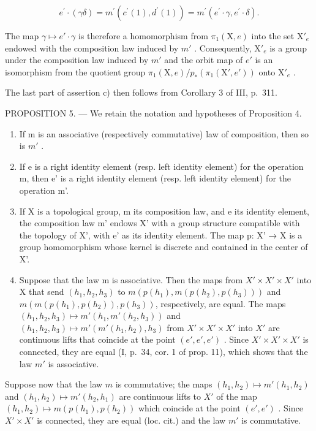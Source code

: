 \[
e ^ {\prime} \cdot (\gamma \delta) = m ^ {\prime} (c ^ {\prime} (1), d ^ {\prime} (1)) = m ^ {\prime} (e ^ {\prime} \cdot \gamma , e ^ {\prime} \cdot \delta).
\]

The map \(\gamma \mapsto e' \cdot \gamma\) is therefore a homomorphism from \(\pi_1(\mathrm{X}, e)\) into the set \(\mathrm{X}'_e\) endowed with the composition law induced by \(m'\) . Consequently, \(\mathrm{X}'_e\) is a group under the composition law induced by \(m'\) and the orbit map of \(e'\) is an isomorphism from the quotient group \(\pi_1(\mathrm{X}, e)/p_*(\pi_1(\mathrm{X}', e'))\) onto \(\mathrm{X}'_e\) .

The last part of assertion c) then follows from Corollary 3 of III, p.~311.

PROPOSITION 5. --- We retain the notation and hypotheses of Proposition 4.

\begin{enumerate}
\def\labelenumi{\alph{enumi})}
\item
  If m is an associative (respectively commutative) law of composition, then so is \(m'\) .
\item
  If e is a right identity element (resp. left identity element) for the operation m, then e' is a right identity element (resp. left identity element) for the operation m'.
\item
  If X is a topological group, m its composition law, and e its identity element, the composition law m' endows X' with a group structure compatible with the topology of X', with e' as its identity element. The map p: X' → X is a group homomorphism whose kernel is discrete and contained in the center of X'.
\item
  Suppose that the law m is associative. Then the maps from \(X' \times X' \times X'\) into X that send \((h_{1}, h_{2}, h_{3})\) to \(m(p(h_{1}),m(p(h_{2}),p(h_{3})))\) and \(m(m(p(h_{1}),p(h_{2})),p(h_{3}))\), respectively, are equal. The maps \((h_{1},h_{2},h_{3})\mapsto m'(h_{1},m'(h_{2},h_{3}))\) and \((h_{1},h_{2},h_{3})\mapsto m'(m'(h_{1},h_{2}),h_{3})\) from \(X'\times X'\times X'\) into \(X'\) are continuous lifts that coincide at the point \((e',e',e')\) . Since \(X'\times X'\times X'\) is connected, they are equal (I, p.~34, cor. 1 of prop. 11), which shows that the law \(m'\) is associative.
\end{enumerate}

Suppose now that the law \(m\) is commutative; the maps \((h_1, h_2) \mapsto m'(h_1, h_2)\) and \((h_1, h_2) \mapsto m'(h_2, h_1)\) are continuous lifts to \(X'\) of the map \((h_1, h_2) \mapsto m(p(h_1), p(h_2))\) which coincide at the point \((e', e')\) . Since \(X' \times X'\) is connected, they are equal (loc. cit.) and the law \(m'\) is commutative.

